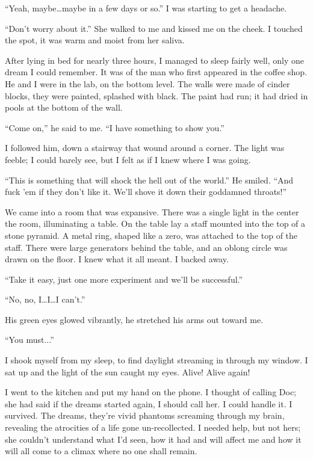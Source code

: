 ``Yeah, maybe\ldots maybe in a few days or so.'' I was starting to get a
headache.

``Don't worry about it.'' She walked to me and kissed me on the cheek. I
touched the spot, it was warm and moist from her saliva.

After lying in bed for nearly three hours, I managed to sleep fairly
well, only one dream I could remember. It was of the man who first
appeared in the coffee shop. He and I were in the lab, on the bottom
level. The walls were made of cinder blocks, they were painted, splashed
with black. The paint had run; it had dried in pools at the bottom of
the wall.

``Come on,'' he said to me. ``I have something to show you.''

I followed him, down a stairway that wound around a corner. The light
was feeble; I could barely see, but I felt as if I knew where I was
going.

``This is something that will shock the hell out of the world.'' He
smiled. ``And fuck 'em if they don't like it. We'll shove it down their
goddamned throats!''

We came into a room that was expansive. There was a single light in the
center the room, illuminating a table. On the table lay a staff mounted
into the top of a stone pyramid. A metal ring, shaped like a zero, was
attached to the top of the staff. There were large generators behind the
table, and an oblong circle was drawn on the floor. I knew what it all
meant. I backed away.

``Take it easy, just one more experiment and we'll be successful.''

``No, no, I\ldots I\ldots I can't.''

His green eyes glowed vibrantly, he stretched his arms out toward me.

``You must...''

I shook myself from my sleep, to find daylight streaming in through my
window. I sat up and the light of the sun caught my eyes. Alive! Alive
again!

I went to the kitchen and put my hand on the phone. I thought of calling
Doc; she had said if the dreams started again, I should call her. I
could handle it. I survived. The dreams, they're vivid phantoms
screaming through my brain, revealing the atrocities of a life gone
un-recollected. I needed help, but not hers; she couldn't understand
what I'd seen, how it had and will affect me and how it will all come to
a climax where no one shall remain.

